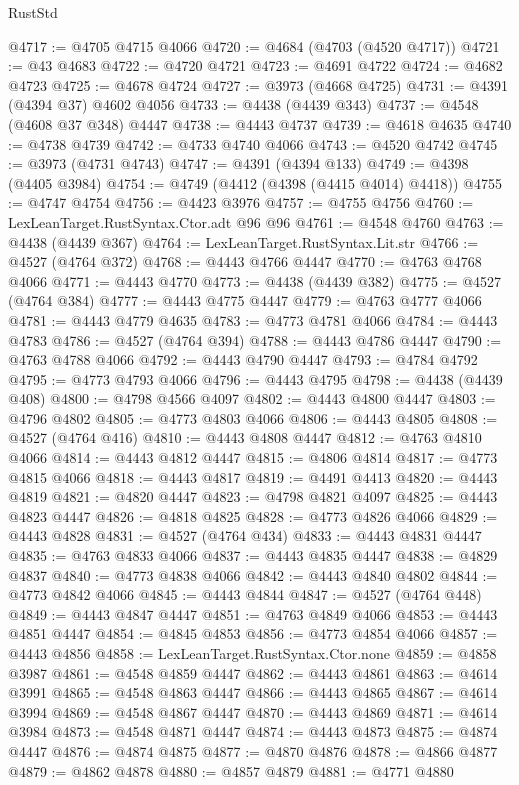 \begin{lexlean}{RustStd}
\begin{coremodule}
@4717 := @4705 @4715 @4066
@4720 := @4684 (@4703 (@4520 @4717))
@4721 := @43 @4683
@4722 := @4720 @4721
@4723 := @4691 @4722
@4724 := @4682 @4723
@4725 := @4678 @4724
@4727 := @3973 (@4668 @4725)
@4731 := @4391 (@4394 @37) @4602 @4056
@4733 := @4438 (@4439 @343)
@4737 := @4548 (@4608 @37 @348) @4447
@4738 := @4443 @4737
@4739 := @4618 @4635
@4740 := @4738 @4739
@4742 := @4733 @4740 @4066
@4743 := @4520 @4742
@4745 := @3973 (@4731 @4743)
@4747 := @4391 (@4394 @133)
@4749 := @4398 (@4405 @3984)
@4754 := @4749 (@4412 (@4398 (@4415 @4014) @4418))
@4755 := @4747 @4754
@4756 := @4423 @3976
@4757 := @4755 @4756
@4760 := LexLeanTarget.RustSyntax.Ctor.adt @96 @96
@4761 := @4548 @4760
@4763 := @4438 (@4439 @367)
@4764 := LexLeanTarget.RustSyntax.Lit.str
@4766 := @4527 (@4764 @372)
@4768 := @4443 @4766 @4447
@4770 := @4763 @4768 @4066
@4771 := @4443 @4770
@4773 := @4438 (@4439 @382)
@4775 := @4527 (@4764 @384)
@4777 := @4443 @4775 @4447
@4779 := @4763 @4777 @4066
@4781 := @4443 @4779 @4635
@4783 := @4773 @4781 @4066
@4784 := @4443 @4783
@4786 := @4527 (@4764 @394)
@4788 := @4443 @4786 @4447
@4790 := @4763 @4788 @4066
@4792 := @4443 @4790 @4447
@4793 := @4784 @4792
@4795 := @4773 @4793 @4066
@4796 := @4443 @4795
@4798 := @4438 (@4439 @408)
@4800 := @4798 @4566 @4097
@4802 := @4443 @4800 @4447
@4803 := @4796 @4802
@4805 := @4773 @4803 @4066
@4806 := @4443 @4805
@4808 := @4527 (@4764 @416)
@4810 := @4443 @4808 @4447
@4812 := @4763 @4810 @4066
@4814 := @4443 @4812 @4447
@4815 := @4806 @4814
@4817 := @4773 @4815 @4066
@4818 := @4443 @4817
@4819 := @4491 @4413
@4820 := @4443 @4819
@4821 := @4820 @4447
@4823 := @4798 @4821 @4097
@4825 := @4443 @4823 @4447
@4826 := @4818 @4825
@4828 := @4773 @4826 @4066
@4829 := @4443 @4828
@4831 := @4527 (@4764 @434)
@4833 := @4443 @4831 @4447
@4835 := @4763 @4833 @4066
@4837 := @4443 @4835 @4447
@4838 := @4829 @4837
@4840 := @4773 @4838 @4066
@4842 := @4443 @4840 @4802
@4844 := @4773 @4842 @4066
@4845 := @4443 @4844
@4847 := @4527 (@4764 @448)
@4849 := @4443 @4847 @4447
@4851 := @4763 @4849 @4066
@4853 := @4443 @4851 @4447
@4854 := @4845 @4853
@4856 := @4773 @4854 @4066
@4857 := @4443 @4856
@4858 := LexLeanTarget.RustSyntax.Ctor.none
@4859 := @4858 @3987
@4861 := @4548 @4859 @4447
@4862 := @4443 @4861
@4863 := @4614 @3991
@4865 := @4548 @4863 @4447
@4866 := @4443 @4865
@4867 := @4614 @3994
@4869 := @4548 @4867 @4447
@4870 := @4443 @4869
@4871 := @4614 @3984
@4873 := @4548 @4871 @4447
@4874 := @4443 @4873
@4875 := @4874 @4447
@4876 := @4874 @4875
@4877 := @4870 @4876
@4878 := @4866 @4877
@4879 := @4862 @4878
@4880 := @4857 @4879
@4881 := @4771 @4880

\end{coremodule}
\end{lexlean}
